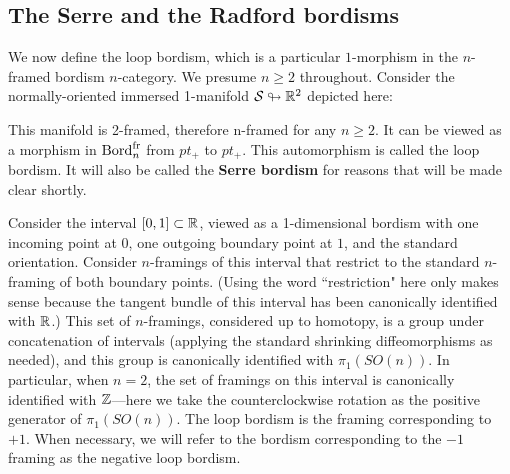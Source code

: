 \documentclass{amsart}
\begin{document}
\subsection{The Serre and the Radford bordisms} \label{sec:SerreRadford}
We now define the loop bordism, which is a particular $1$-morphism in the $n$-framed bordism $n$-category.  We presume $n \geq 2$ throughout.  
Consider the normally-oriented immersed 1-manifold $\mathcal S \looparrowright \mathbb R^2$ depicted here:
\begin{center}
\end{center}
\nid This manifold is 2-framed, therefore n-framed for any $n \geq 2$.  It can be viewed as a morphism in $\mathrm{Bord}^\mathrm{fr}_n$ from $pt_+$ to $pt_+$.  This automorphism is called the loop bordism.  It will also be called the {\bfseries Serre bordism} for reasons that will be made clear shortly.   

\begin{remark}
Consider the interval $[0,1] \subset \mathbb R$, viewed as a 1-dimensional bordism with one incoming  point at $0$, one outgoing boundary point at $1$, and the standard orientation.  Consider $n$-framings of this interval that restrict to the standard $n$-framing of both boundary points.  (Using the word ``restriction" here only makes sense because the tangent bundle of this interval has been canonically identified with $\mathbb R$.)  This set of $n$-framings, considered up to homotopy, is a group under concatenation of intervals (applying the standard shrinking diffeomorphisms as needed), and this group is canonically identified with $\pi_1(SO(n))$.  In particular, when $n=2$, the set of framings on this interval is canonically identified with $\mathbb Z$---here we take the counterclockwise rotation as the positive generator of $\pi_1(SO(n))$.  The loop bordism is the framing corresponding to $+1$.  When necessary, we will refer to the bordism corresponding to the $-1$ framing as the negative loop bordism.
\end{remark}
\end{document}
